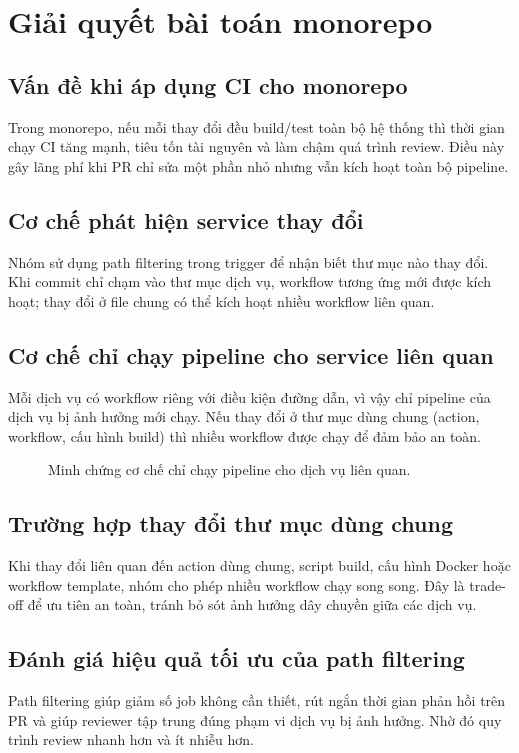 \section{Giải quyết bài toán monorepo}

\subsection{Vấn đề khi áp dụng CI cho monorepo}
Trong monorepo, nếu mỗi thay đổi đều build/test toàn bộ hệ thống thì thời gian chạy CI tăng mạnh, tiêu tốn tài nguyên và làm chậm quá trình review. Điều này gây lãng phí khi PR chỉ sửa một phần nhỏ nhưng vẫn kích hoạt toàn bộ pipeline.

\subsection{Cơ chế phát hiện service thay đổi}
Nhóm sử dụng path filtering trong trigger để nhận biết thư mục nào thay đổi. Khi commit chỉ chạm vào thư mục dịch vụ, workflow tương ứng mới được kích hoạt; thay đổi ở file chung có thể kích hoạt nhiều workflow liên quan.

\subsection{Cơ chế chỉ chạy pipeline cho service liên quan}
Mỗi dịch vụ có workflow riêng với điều kiện đường dẫn, vì vậy chỉ pipeline của dịch vụ bị ảnh hưởng mới chạy. Nếu thay đổi ở thư mục dùng chung (action, workflow, cấu hình build) thì nhiều workflow được chạy để đảm bảo an toàn.

\begin{figure}[H]
	\centering
	\caption{Minh chứng cơ chế chỉ chạy pipeline cho dịch vụ liên quan.}
\end{figure}

\subsection{Trường hợp thay đổi thư mục dùng chung}
Khi thay đổi liên quan đến action dùng chung, script build, cấu hình Docker hoặc workflow template, nhóm cho phép nhiều workflow chạy song song. Đây là trade-off để ưu tiên an toàn, tránh bỏ sót ảnh hưởng dây chuyền giữa các dịch vụ.

\subsection{Đánh giá hiệu quả tối ưu của path filtering}
Path filtering giúp giảm số job không cần thiết, rút ngắn thời gian phản hồi trên PR và giúp reviewer tập trung đúng phạm vi dịch vụ bị ảnh hưởng. Nhờ đó quy trình review nhanh hơn và ít nhiễu hơn.

